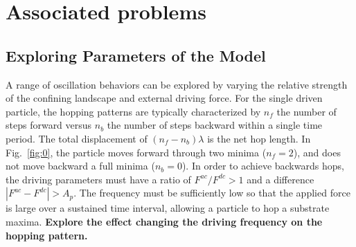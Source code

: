 \documentclass[twocolumn,preprintnumbers,amsmath,amssymb,aps,prx]{revtex4}
\begin{document}
\section{Associated problems}
\label{sec:problems}	%

  \subsection{Exploring Parameters of the Model}
  \label{ex:parameters}

  A range of oscillation behaviors
  can be explored by varying the
  relative strength of the confining landscape
  and external driving force.
  For the single driven particle,
  the hopping patterns are typically characterized
  by $n_f$ the number of steps forward
  versus $n_b$ the number of steps backward within a single
  time period.
  The total displacement of $(n_f - n_b) \lambda$ %
  is the net hop length.  
  In Fig.~\ref{fig:0},
  the particle moves forward through two minima ($n_f = 2$),
  and does not move backward a full minima ($n_b = 0$).  
  In order to achieve
  backwards hops,
  the driving parameters must have
  a ratio of $F^{ac}/F^{dc} > 1$ 
  and a difference $|F^{ac} - F^{dc}| > A_p$.
  The frequency must be sufficiently low so that 
  the applied force is large
  over a sustained time interval,
  allowing a particle to hop a substrate maxima.
  {\bf Explore the effect changing the driving frequency on the hopping pattern.}
\end{document}
